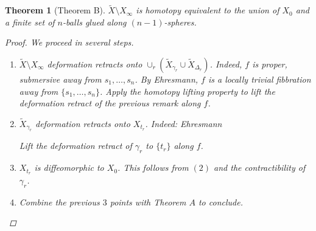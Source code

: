 \documentclass[A4paper, british, reqno]{amsart}
\theoremstyle{darkgreentheorem}
\newtheorem{thm}{Theorem}[section]
\theoremstyle{darkbluedefinition}
\theoremstyle{darkredexample}
\theoremstyle{remark}
\newcommand{\1}{\mathbbm{1}}
\begin{document}
\begin{thm}[Theorem B]
    $\tilde{X}\setminus X_{\infty}$ is homotopy equivalent to the union of $X_{0}$ and a finite set of $n$-balls glued along $(n-1)$-spheres.
    \begin{proof}
	We proceed in several steps.
	\begin{enumerate}
	    \item $\tilde{X}\setminus X_{\infty}$ deformation retracts onto $\cup_{r}(\tilde{X}_{\gamma_{r}}\cup \tilde{X}_{\Delta_{r}})$.
		Indeed, $f$ is proper, submersive away from $s_{1},\ldots,s_{n}$.
		By Ehresmann, $f$ is a locally trivial fibbration away from $\{s_{1},\ldots,s_{n}\}$.
		Apply the homotopy lifting property to lift the deformation retract of the previous remark along $f$.
	    \item $\tilde{X}_{\gamma_{r}}$ deformation retracts onto $X_{t_{r}}$.
		Indeed: Ehresmann
		\begin{center}
		\end{center}
		Lift the deformation retract of $\gamma_{r}$ to $\{t_{r}\}$ along $f$.
	    \item $X_{t_{r}}$ is diffeomorphic to $X_{0}$.
		This follows from $(2)$ and the contractibility of $\gamma_{r}$.
	    \item Combine the previous $3$ points with Theorem $A$ to conclude.
	\end{enumerate}
    \end{proof}
\end{thm}
\end{document}
